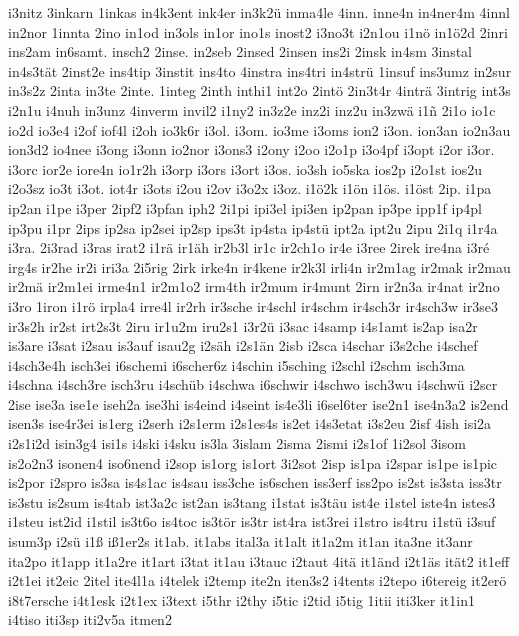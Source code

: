 {i3nitz
3inkarn
1inkas
in4k3ent
ink4er
in3k2ü
inma4le
4inn.
inne4n
in4ner4m
4innl
in2nor
1innta
2ino
in1od
in3ols
in1or
ino1s
inost2
i3no3t
i2n1ou
i1nö
in1ö2d
2inri
ins2am
in6samt.
insch2
2inse.
in2seb
2insed
2insen
ins2i
2insk
in4sm
3instal
in4s3tät
2inst2e
ins4tip
3instit
ins4to
4instra
ins4tri
in4strü
1insuf
ins3umz
in2sur
in3s2z
2inta
in3te
2inte.
1integ
2inth
inthi1
int2o
2intö
2in3t4r
4inträ
3intrig
int3s
i2n1u
i4nuh
in3unz
4inverm
invil2
i1ny2
in3z2e
inz2i
inz2u
in3zwä
i1ñ
2i1o
io1c
io2d
io3e4
i2of
iof4l
i2oh
io3k6r
i3ol.
i3om.
io3me
i3oms
ion2
i3on.
ion3an
io2n3au
ion3d2
io4nee
i3ong
i3onn
io2nor
i3ons3
i2ony
i2oo
i2o1p
i3o4pf
i3opt
i2or
i3or.
i3orc
ior2e
iore4n
io1r2h
i3orp
i3ors
i3ort
i3os.
io3sh
io5ska
ios2p
i2o1st
ios2u
i2o3sz
io3t
i3ot.
iot4r
i3ots
i2ou
i2ov
i3o2x
i3oz.
i1ö2k
i1ön
i1ös.
i1öst
2ip.
i1pa
ip2an
i1pe
i3per
2ipf2
i3pfan
iph2
2i1pi
ipi3el
ipi3en
ip2pan
ip3pe
ipp1f
ip4pl
ip3pu
i1pr
2ips
ip2sa
ip2sei
ip2sp
ips3t
ip4sta
ip4stü
ipt2a
ipt2u
2ipu
2i1q
i1r4a
i3ra.
2i3rad
i3ras
irat2
i1rä
ir1äh
ir2b3l
ir1c
ir2ch1o
ir4e
i3ree
2irek
ire4na
i3ré
irg4s
ir2he
ir2i
iri3a
2i5rig
2irk
irke4n
ir4kene
ir2k3l
irli4n
ir2m1ag
ir2mak
ir2mau
ir2mä
ir2m1ei
irme4n1
ir2m1o2
irm4th
ir2mum
ir4munt
2irn
ir2n3a
ir4nat
ir2no
i3ro
1iron
i1rö
irpla4
irre4l
ir2rh
ir3sche
ir4schl
ir4schm
ir4sch3r
ir4sch3w
ir3se3
ir3s2h
ir2st
irt2s3t
2iru
ir1u2m
iru2s1
i3r2ü
i3sac
i4samp
i4s1amt
is2ap
isa2r
is3are
i3sat
i2sau
is3auf
isau2g
i2säh
i2s1än
2isb
i2sca
i4schar
i3s2che
i4schef
i4sch3e4h
isch3ei
i6schemi
i6scher6z
i4schin
i5sching
i2schl
i2schm
isch3ma
i4schna
i4sch3re
isch3ru
i4schüb
i4schwa
i6schwir
i4schwo
isch3wu
i4schwü
i2scr
2ise
ise3a
ise1e
iseh2a
ise3hi
is4eind
i4seint
is4e3li
i6sel6ter
ise2n1
ise4n3a2
is2end
isen3s
ise4r3ei
is1erg
i2serh
i2s1erm
i2s1es4s
is2et
i4s3etat
i3s2eu
2isf
4ish
isi2a
i2s1i2d
isin3g4
isi1s
i4ski
i4sku
is3la
3islam
2isma
2ismi
i2s1of
1i2sol
3isom
is2o2n3
isonen4
iso6nend
i2sop
is1org
is1ort
3i2sot
2isp
is1pa
i2spar
is1pe
is1pic
is2por
i2spro
is3sa
is4s1ac
is4sau
iss3che
is6schen
iss3erf
iss2po
is2st
is3sta
iss3tr
is3stu
is2sum
is4tab
ist3a2c
ist2an
is3tang
i1stat
is3täu
ist4e
i1stel
iste4n
istes3
i1steu
ist2id
i1stil
is3t6o
is4toc
is3tör
is3tr
ist4ra
ist3rei
i1stro
is4tru
i1stü
i3suf
isum3p
i2sü
i1ß
iß1er2s
it1ab.
it1abs
ital3a
it1alt
it1a2m
it1an
ita3ne
it3anr
ita2po
it1app
it1a2re
it1art
i3tat
it1au
i3tauc
i2taut
4itä
it1änd
i2t1äs
ität2
it1eff
i2t1ei
it2eic
2itel
ite4l1a
i4telek
i2temp
ite2n
iten3s2
i4tents
i2tepo
i6tereig
it2erö
i8t7ersche
i4t1esk
i2t1ex
i3text
i5thr
i2thy
i5tic
i2tid
i5tig
1itii
iti3ker
it1in1
i4tiso
iti3sp
iti2v5a
itmen2
}
